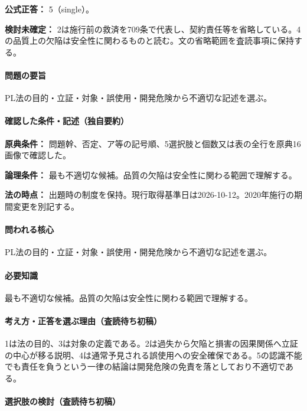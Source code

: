 \textbf{公式正答：} 5（single）。

\par\textbf{検討未確定：} 2は施行前の救済を709条で代表し、契約責任等を省略している。4の品質上の欠陥は安全性に関わるものと読む。文の省略範囲を査読事項に保持する。

\paragraph{問題の要旨} PL法の目的・立証・対象・誤使用・開発危険から不適切な記述を選ぶ。

\paragraph{確認した条件・記述（独自要約）}\mbox{}\par

\noindent\textbf{原典条件：} 問題幹、否定、ア等の記号順、5選択肢と個数又は表の全行を原典16画像で確認した。\par

\noindent\textbf{論理条件：} 最も不適切な候補。品質の欠陥は安全性に関わる範囲で理解する。\par

\noindent\textbf{法の時点：} 出題時の制度を保持。現行取得基準日は2026-10-12。2020年施行の期間変更を別記する。\par

\paragraph{問われる核心} PL法の目的・立証・対象・誤使用・開発危険から不適切な記述を選ぶ。

\paragraph{必要知識} 最も不適切な候補。品質の欠陥は安全性に関わる範囲で理解する。

\paragraph{考え方・正答を選ぶ理由（査読待ち初稿）} 1は法の目的、3は対象の定義である。2は過失から欠陥と損害の因果関係へ立証の中心が移る説明、4は通常予見される誤使用への安全確保である。5の認識不能でも責任を負うという一律の結論は開発危険の免責を落としており不適切である。

\paragraph{選択肢の検討（査読待ち初稿）}\mbox{}\par


